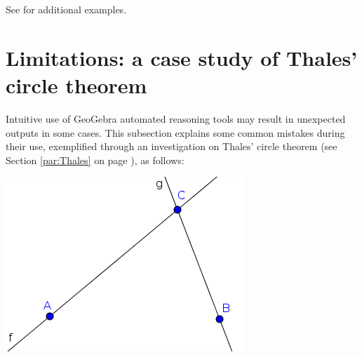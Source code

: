 \documentclass{article}
\begin{document}
See \cite{Kovacs2017} for additional examples.

\section{Limitations: a case study of Thales' circle theorem}\label{sec:limits}

Intuitive use of GeoGebra automated reasoning tools may result in unexpected outputs in some cases. This subsection explains some common mistakes during their use, exemplified through an investigation on Thales' circle theorem  (see Section \ref{par:Thales} on page \pageref{par:Thales}), as follows:

\begin{center}
\includegraphics[scale=0.5]{limitations-Thales1-1}
\end{center}
\end{document}
